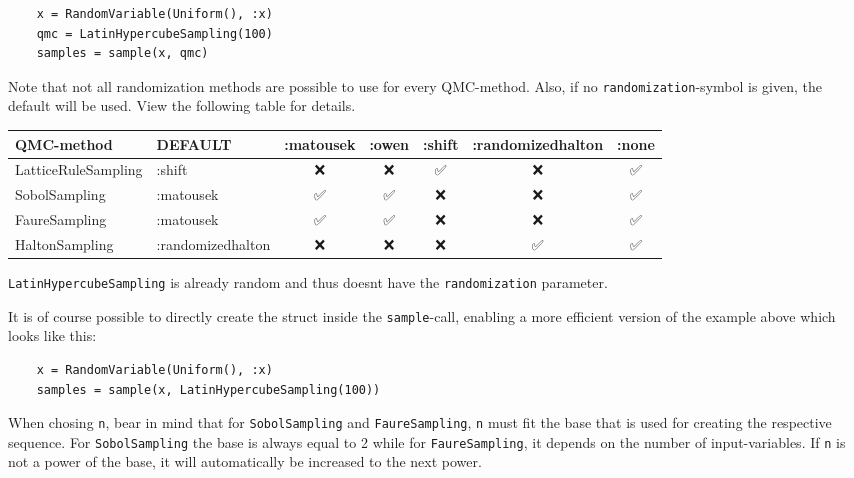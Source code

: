 \begin{verbatim}
    x = RandomVariable(Uniform(), :x)
    qmc = LatinHypercubeSampling(100)
    samples = sample(x, qmc)
\end{verbatim}



Note that not all randomization methods are possible to use for every QMC-method. Also, if no \texttt{randomization}-symbol is given, the default will be used. View the following table for details.




\begin{table}[h]
\centering
\begin{tabulary}{\linewidth}{L L C C C C C}
\toprule
QMC-method & DEFAULT & :matousek & :owen & :shift & :randomizedhalton & :none \\
\toprule
LatticeRuleSampling & :shift & ❌ & ❌ & ✅ & ❌ & ✅ \\
SobolSampling & :matousek & ✅ & ✅ & ❌ & ❌ & ✅ \\
FaureSampling & :matousek & ✅ & ✅ & ❌ & ❌ & ✅ \\
HaltonSampling & :randomizedhalton & ❌ & ❌ & ❌ & ✅ & ✅ \\
\bottomrule
\end{tabulary}

\end{table}



\begin{tcolorbox}[toptitle=-1mm,bottomtitle=1mm,colback=admonition-note!50!white,colframe=admonition-note,title=\textbf{Note}]
\texttt{LatinHypercubeSampling} is already random and thus doesn{\textquotesingle}t have the \texttt{randomization} parameter.

\end{tcolorbox}


It is of course possible to directly create the struct inside the \texttt{sample}-call, enabling a more efficient version of the example above which looks like this:




\begin{verbatim}
    x = RandomVariable(Uniform(), :x)
    samples = sample(x, LatinHypercubeSampling(100))
\end{verbatim}



\begin{tcolorbox}[toptitle=-1mm,bottomtitle=1mm,colback=admonition-note!50!white,colframe=admonition-note,title=\textbf{Note}]
When chosing \texttt{n}, bear in mind that for \texttt{SobolSampling} and \texttt{FaureSampling}, \texttt{n} must fit the base that is used for creating the respective sequence. For \texttt{SobolSampling} the base is always equal to 2 while for \texttt{FaureSampling}, it depends on the number of input-variables. If \texttt{n} is not a power of the base, it will automatically be increased to the next power.

\end{tcolorbox}



